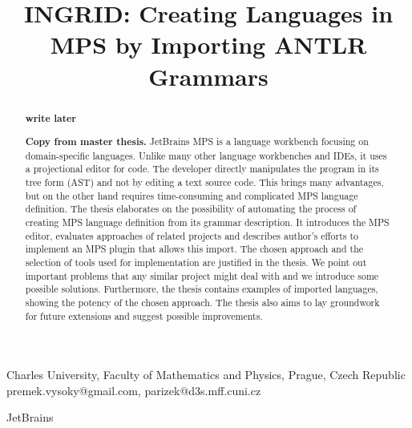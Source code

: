 \documentclass[10pt]{sigplanconf}
\newcommand{\todo}[1]{{\bfseries #1}}
\begin{document}


\title{\todo{INGRID: Creating Languages in MPS by Importing ANTLR Grammars}}


	{Charles University, Faculty of Mathematics and Physics, Prague, Czech Republic}
	{premek.vysoky@gmail.com, parizek@d3s.mff.cuni.cz}

	{JetBrains}


\maketitle

\begin{abstract}
\todo{write later}

\todo{Copy from master thesis.}
JetBrains MPS is a language workbench focusing on domain-specific languages.
Unlike many other language workbenches and IDEs, it uses a projectional editor for code.
The developer directly manipulates the program in its tree form (AST) and not by editing a text source code.
This brings many advantages, but on the other hand requires time-consuming and complicated MPS language definition.
The thesis elaborates on the possibility of automating the process of creating MPS language definition from its grammar description.
It introduces the MPS editor, evaluates approaches of related projects and describes author's efforts to implement an MPS plugin that allows this import.
The chosen approach and the selection of tools used for implementation are justified in the thesis.
We point out important problems that any similar project might deal with and we introduce some possible solutions.
Furthermore, the thesis contains examples of imported languages, showing the potency of the chosen approach.
The thesis also aims to lay groundwork for future extensions and suggest possible improvements.
\end{abstract}

\end{document}
